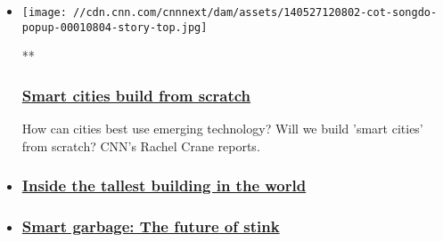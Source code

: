 \begin{itemize}
\item
  \href{/videos/tech/2014/05/27/cot-songdo-popup.cnn}{}

  \texttt{[image: //cdn.cnn.com/cnnnext/dam/assets/140527120802-cot-songdo-popup-00010804-story-top.jpg]}

  **

  \hypertarget{smart-cities-build-from-scratch}{%
  \subsubsection{\texorpdfstring{\href{/videos/tech/2014/05/27/cot-songdo-popup.cnn}{Smart
  cities build from
  scratch}}{Smart cities build from scratch}}\label{smart-cities-build-from-scratch}}

  How can cities best use emerging technology? Will we build 'smart
  cities' from scratch? CNN's Rachel Crane reports.
\item
  \hypertarget{inside-the-tallest-building-in-the-world}{%
  \subsubsection{\texorpdfstring{\href{/videos/tech/2014/06/19/cot-dubai-burj-khalifa.cnn}{Inside
  the tallest building in the
  world}}{Inside the tallest building in the world}}\label{inside-the-tallest-building-in-the-world}}
\item
  \hypertarget{smart-garbage-the-future-of-stink}{%
  \subsubsection{\texorpdfstring{\href{/videos/tech/2014/05/23/cot-philly-smart-trash.cnn}{Smart
  garbage: The future of
  stink}}{Smart garbage: The future of stink}}\label{smart-garbage-the-future-of-stink}}
\end{itemize}

